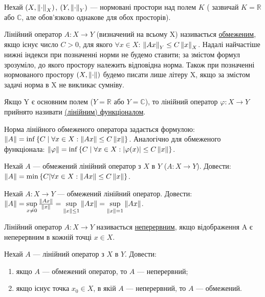 
\begin{theory}
    Нехай $(X, \left\lVert\cdot\right\rVert_X)$, $(Y, \left\lVert\cdot\right\rVert_Y)$ --- нормовані простори над полем $K$ (
        зазвичай $K = 
    \mathbb{R}$ або $\mathbb{C}$, 
    але обов'язково однакове для обох просторів). 

    Лінійний оператор $A: X \rightarrow Y$ (визначений на всьому X) називається 
    \underline{обмеженим}, якщо існує число $C > 0$, для якого $\forall x \in X$: 
    $\left\lVert Ax\right\rVert_Y \leq C \left\lVert x\right\rVert_X$. Надалі найчастіше нижні індекси при позначенні норми 
    не будемо ставити; за змістом формул зрозуміло, до якого простору належить відповідна 
    норма. Також при позначенні нормованого простору $(X, \left\lVert\cdot\right\rVert)$ будемо писати лише 
    літеру X, якщо за змістом задачі норма в X не викликає сумніву. 

    Якщо Y є основним полем ($Y=\mathbb{R}$ або $Y = \mathbb{C}$), то лінійний оператор 
    $\varphi: X \rightarrow Y$ прийнято називати \underline{(лінійним) функціоналом}.

    Норма лінійного обмеженого оператора задається формулою:
    $\left\lVert A\right\rVert = \inf\left\{C\;|\;\forall x \in X : \left\lVert Ax\right\rVert\leq C\left\lVert x\right\rVert \right\}$.
    Аналогічно для обмеженого функціонала:
    $\left\lVert\varphi\right\rVert = \inf\left\{C \;|\; \forall x \in X : |\varphi(x)| \leq C\left\lVert x\right\rVert \right\}$.
\end{theory}

\begin{exercise}
    Нехай $A$ --- обмежений лінійний оператор з $X$ в $Y$ ($A: X \rightarrow Y$).
    Довести: $\left\lVert A\right\rVert = \min\left\{C|\forall x \in X : \left\lVert Ax\right\rVert \leq C\left\lVert x\right\rVert\right\}$.
\end{exercise}

\begin{exercise}
    Нехай $A: X \rightarrow Y$ --- обмежений лінійний оператор.
    Довести: $\left\lVert A\right\rVert = \sup\limits_{x \neq 0}\frac{\left\lVert Ax\right\rVert}{\left\lVert x\right\rVert} = 
    \sup\limits_{\left\lVert x\right\rVert \leq 1}\left\lVert Ax\right\rVert = \sup\limits_{\left\lVert x\right\rVert = 1}\left\lVert Ax\right\rVert$.
\end{exercise}

\begin{theory}
    Лінійний оператор $A: X \rightarrow Y$ називається \underline{неперервним}, якщо відображення 
    A є неперервним в кожній точці $x \in X$.
\end{theory}

\begin{exercise}
    Нехай $A$ --- лінійний оператор з $X$ в $Y$. Довести: 
    \begin{enumerate}[label=\alph*)]
        \item якщо $A$ --- обмежений оператор, то $A$ --- неперервний;
        \item якщо існує точка $x_0 \in X$, в якій $A$ --- неперервний, то $A$ --- обмежений.
    \end{enumerate}
\end{exercise}

